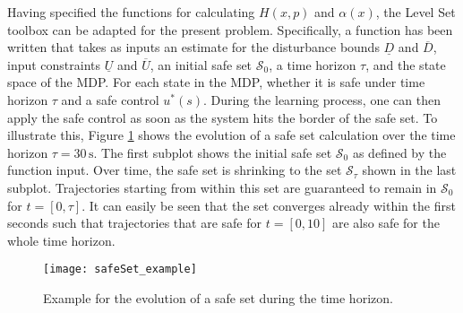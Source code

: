 \documentclass[../main.tex]{subfiles}
\begin{document}
Having specified the functions for calculating $H(x,p)$ and $\alpha(x)$, the Level Set toolbox can be adapted for the present problem. Specifically, a function has been written that takes as inputs an estimate for the disturbance bounds $\underline{D}$ and $\overline{D}$, input constraints $\underline{U}$ and $\overline{U}$, an initial safe set $\mathcal{S}_0$, a time horizon $\tau$, and the state space of the MDP. For each state in the MDP, whether it is safe under time horizon $\tau$ and a safe control $u^*(s)$. During the learning process, one can then apply the safe control as soon as the system hits the border of the safe set. To illustrate this, Figure \ref{fig:safeSet_example} shows the evolution of a safe set calculation over the time horizon $\tau = 30\,\text{s}$. The first subplot shows the initial safe set $\mathcal{S}_0$ as defined by the function input. Over time, the safe set is shrinking to the set $\mathcal{S}_\tau$ shown in the last subplot. Trajectories starting from within this set are guaranteed to remain in $\mathcal{S}_0$ for $t = [0, \tau]$. It can easily be seen that the set converges already within the first seconds such that trajectories that are safe for $t = [0, 10]$ are also safe for the whole time horizon. 

\begin{figure}[H]
    \centering
    \texttt{[image: safeSet\_example]}
        \caption{Example for the evolution of a safe set during the time horizon.}    
    \label{fig:safeSet_example}
\end{figure}
\end{document}
